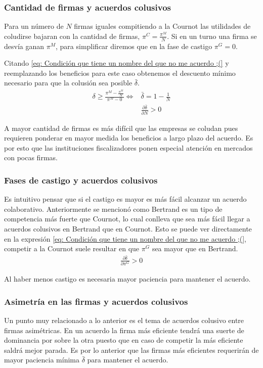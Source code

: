 \subsubsection*{Cantidad de firmas y acuerdos colusivos}

Para un número de $N$ firmas iguales compitiendo a la Cournot las utilidades de coludirse bajaran con la cantidad de firmas, $\pi^C = \frac{\pi^M}{N}$. Si en un turno una firma se desvía ganan $\pi^M$, para simplificar diremos que en la fase de castigo $\pi^G = 0$.

Citando \ref{eq: Condición que tiene un nombre del que no me acuerdo ;(} y reemplazando los beneficios para este caso obtenemos el descuento mínimo necesario para que la colusión sea posible $\bar{\delta}$. 
\begin{align*}
    \delta \geq \frac{\pi^M - \frac{\pi^M}{N}}{\pi ^M - 0} \Longleftrightarrow &\bar{\delta} = 1 - \frac{1}{N} \\
    & \frac{\partial \bar{\delta}}{\partial N} > 0
\end{align*}

A mayor cantidad de firmas es más difícil que las empresas se coludan pues requieren ponderar en mayor medida los beneficios a largo plazo del acuerdo. Es por esto que las instituciones fiscalizadores ponen especial atención en mercados con pocas firmas. 

\subsubsection*{Fases de castigo y acuerdos colusivos}

Es intuitivo pensar que si el castigo es mayor es más fácil alcanzar un acuerdo colaborativo. Anteriormente se mencionó como Bertrand es un tipo de competencia más fuerte que Cournot, lo cual conlleva que sea más fácil llegar a acuerdos colusivos en Bertrand que en Cournot. Esto se puede ver directamente en la expresión \ref{eq: Condición que tiene un nombre del que no me acuerdo ;(}, competir a la Cournot suele resultar en que $\pi^G$ sea mayor que en Bertrand. 
\begin{align*}
    \frac{\partial \bar{\delta}}{\partial \pi^G} > 0
\end{align*}

Al haber menos castigo es necesaria mayor paciencia para mantener el acuerdo. 

\subsubsection*{Asimetría en las firmas y acuerdos colusivos}

Un punto muy relacionado a lo anterior es el tema de acuerdos colusivo entre firmas asimétricas. En un acuerdo la firma más eficiente tendrá una suerte de dominancia por sobre la otra puesto que en caso de competir la más eficiente saldrá mejor parada. Es por lo anterior que las firmas más eficientes requerirán de mayor paciencia mínima $\bar{\delta}$ para mantener el acuerdo. 